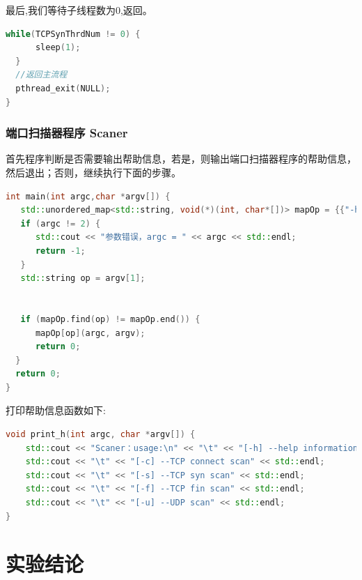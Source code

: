 \documentclass[UTF8,a4paper,10pt]{ctexart}
\begin{document}
最后,我们等待子线程数为0,返回。
\begin{lstlisting}[language = C++]
   while(TCPSynThrdNum != 0) { 
      sleep(1);
  }
  //返回主流程
  pthread_exit(NULL);
}  
\end{lstlisting}


































\subsubsection{端口扫描器程序 Scaner}
首先程序判断是否需要输出帮助信息，若是，则输出端口扫描器程序的帮助信息，
然后退出；否则，继续执行下面的步骤。
\begin{lstlisting}[language = C++]
int main(int argc,char *argv[]) { 
   std::unordered_map<std::string, void(*)(int, char*[])> mapOp = {{"-h", print_h}, {"-c", print_c}, {"-s", print_s}, {"-u", print_u}, {"-f", print_f}};
   if (argc != 2) { 
      std::cout << "参数错误，argc = " << argc << std::endl;
      return -1;
   }
   std::string op = argv[1];


   if (mapOp.find(op) != mapOp.end()) {
      mapOp[op](argc, argv);
      return 0;
  }
  return 0;
}
\end{lstlisting}
打印帮助信息函数如下:
\begin{lstlisting}[language = C++]
void print_h(int argc, char *argv[]) {
    std::cout << "Scaner：usage:\n" << "\t" << "[-h] --help information " << std::endl;
    std::cout << "\t" << "[-c] --TCP connect scan" << std::endl;
    std::cout << "\t" << "[-s] --TCP syn scan" << std::endl;
    std::cout << "\t" << "[-f] --TCP fin scan" << std::endl;
    std::cout << "\t" << "[-u] --UDP scan" << std::endl;
}
\end{lstlisting}






































\section{实验结论}
\end{document}
